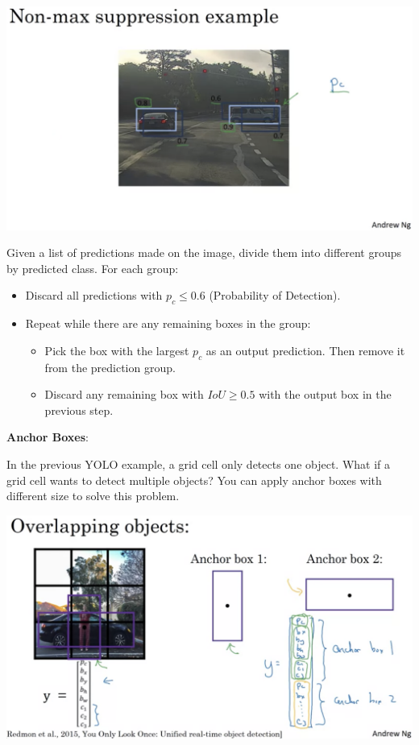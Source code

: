 \documentclass{article}
\begin{document}
\begin{center}
\includegraphics[scale=0.3]{./images/nonmax_suppression.png}
\end{center}

\noindent Given a list of predictions made on the image, divide them into different groups by predicted class. For each group:

\begin{itemize}
    \item Discard all predictions with \(p_{c} \leq 0.6\) (Probability of Detection).
    \item Repeat while there are any remaining boxes in the group:
    \begin{itemize}
        \item Pick the box with the largest \(p_{c}\) as an output prediction. Then remove it from the prediction group.
        \item Discard any remaining box with \(IoU \geq 0.5\) with the output box in the previous step.
    \end{itemize}
\end{itemize}

\noindent \textbf{Anchor Boxes}:

\noindent In the previous YOLO example, a grid cell only detects one object. What if a grid cell wants to detect multiple objects? You can apply anchor boxes with different size to solve this problem.

\begin{center}
\includegraphics[scale=0.3]{./images/anchor_box.png}
\end{center}
\end{document}
